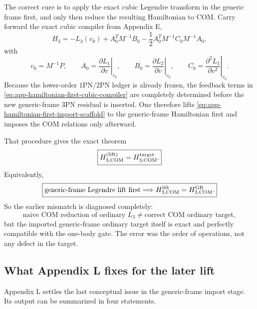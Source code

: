 \documentclass[11pt]{article}
\begin{document}
The correct cure is to apply the exact cubic Legendre transform in the generic
frame first, and only then reduce the resulting Hamiltonian to COM.  Carry
forward the exact cubic compiler from Appendix E,
\begin{equation}
H_3=-L_3(v_0)+A_0^TM^{-1}B_0-\frac12A_0^TM^{-1}C_0M^{-1}A_0,
\label{eq:app-hamiltonian-first-cubic-compiler}
\end{equation}
with
\begin{equation}
v_0=M^{-1}P,
\qquad
A_0=\left.\frac{\partial L_1}{\partial v}\right|_{v_0},
\qquad
B_0=\left.\frac{\partial L_2}{\partial v}\right|_{v_0},
\qquad
C_0=\left.\frac{\partial^2L_1}{\partial v^2}\right|_{v_0}.
\label{eq:app-hamiltonian-first-ABCM}
\end{equation}
Because the lower-order $1$PN/$2$PN ledger is already frozen, the feedback terms
in \eqref{eq:app-hamiltonian-first-cubic-compiler} are completely determined
before the new generic-frame $3$PN residual is inserted.  One therefore lifts
\eqref{eq:app-hamiltonian-first-import-scaffold} to the generic-frame
Hamiltonian first and imposes the COM relations only afterward.

That procedure gives the exact theorem
\begin{equation}
\boxed{H_{3,\rm COM}^{\rm(lift)}=H_{3,\rm COM}^{\rm target}.}
\label{eq:app-hamiltonian-first-theorem}
\end{equation}
Equivalently,
\begin{equation}
\boxed{
\text{generic-frame Legendre lift first}
\Longrightarrow
H_{3,\rm COM}^{\rm lift}=H_{3,\rm COM}^{\rm GR}.}
\label{eq:app-hamiltonian-first-theorem-boxed}
\end{equation}
So the earlier mismatch is diagnosed completely:
\begin{equation}
\text{naive COM reduction of ordinary }L_3
\neq
\text{correct COM ordinary target},
\label{eq:app-hamiltonian-first-ordering-diagnosis}
\end{equation}
but the imported generic-frame ordinary target itself is exact and perfectly
compatible with the one-body gate.  The error was the order of operations, not
any defect in the target.

\subsection{What Appendix L fixes for the later lift}
\label{app:hamiltonian-first-fixes}

Appendix L settles the last conceptual issue in the generic-frame import stage.
Its output can be summarized in four statements.
\end{document}
